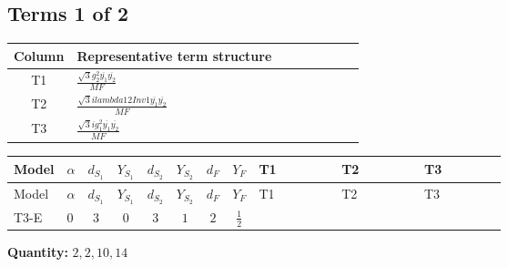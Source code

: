 \documentclass[8pt]{article}
\begin{document}
\begin{landscape}
\subsection*{Terms 1 of 2}
\begin{center}
\begin{tabular}{@{}c >{\raggedright\arraybackslash}p{0.82\linewidth}@{}}
\toprule
Column & Representative term structure \\
\midrule
T1 & \(\displaystyle \frac{\sqrt{3} g_{2}^{2} \overline{y_{1}} \overline{y_{2}}}{MF}\) \\
\midrule
T2 & \(\displaystyle \frac{\sqrt{3} i lambda12Inv1 \overline{y_{1}} \overline{y_{2}}}{MF}\) \\
\midrule
T3 & \(\displaystyle \frac{\sqrt{3} i g_{1}^{2} \overline{y_{1}} \overline{y_{2}}}{MF}\) \\
\midrule
\bottomrule
\end{tabular}
\end{center}
\smallskip
\tiny
\begin{longtable}{@{}llcccccc >{\raggedright\arraybackslash}p{0.21\linewidth} >{\raggedright\arraybackslash}p{0.21\linewidth} >{\raggedright\arraybackslash}p{0.21\linewidth}@{}}
\toprule
Model & $\alpha$ & $d_{S_1}$ & $Y_{S_1}$ & $d_{S_2}$ & $Y_{S_2}$ & $d_F$ & $Y_F$ & T1 & T2 & T3 \\
\midrule
\endfirsthead
\toprule
Model & $\alpha$ & $d_{S_1}$ & $Y_{S_1}$ & $d_{S_2}$ & $Y_{S_2}$ & $d_F$ & $Y_F$ & T1 & T2 & T3 \\
\midrule
\endhead
T3-E & $0$ & $3$ & $0$ & $3$ & $1$ & $2$ & $\frac{1}{2}$ & \scriptsize\adjustbox{max width=\linewidth}{$\begin{gathered} - \frac{\sqrt{3} g_{2}^{2} \overline{y_{1}} \overline{y_{2}}}{6 MF}\end{gathered}$} & \scriptsize\adjustbox{max width=\linewidth}{$\begin{gathered} - \frac{\sqrt{3} i lambda12Inv1 \overline{y_{1}} \overline{y_{2}}}{6 MF}\end{gathered}$} & \scriptsize\adjustbox{max width=\linewidth}{$\begin{gathered} \frac{\sqrt{3} i g_{1}^{2} \overline{y_{1}} \overline{y_{2}}}{8 MF}\end{gathered}$} \\
\midrule
\bottomrule
\end{longtable}
\clearpage
\noindent\textbf{Quantity: }$\mathrm{2,2,10,14}$\par\smallskip

\end{landscape}
\end{document}
